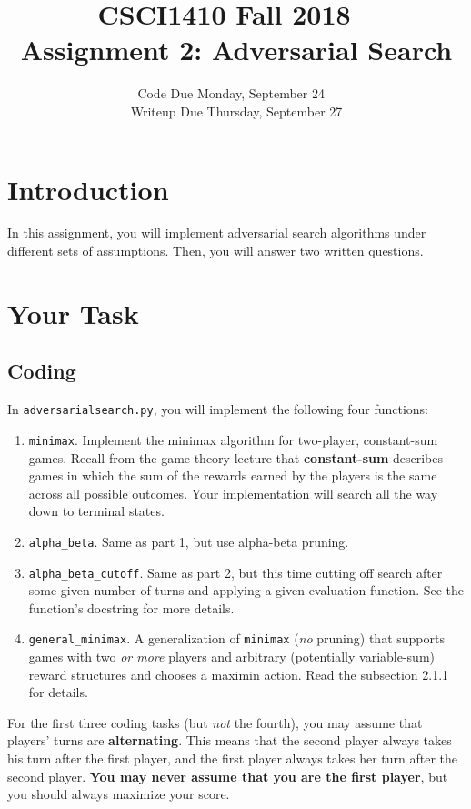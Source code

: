 \documentclass{article}
\title{CSCI1410 Fall 2018 ~\\
Assignment 2: Adversarial Search}
\date{Code Due Monday, September 24 ~\\
Writeup Due Thursday, September 27}
\begin{document}
\maketitle

\section{Introduction}
In this assignment, you will implement adversarial search algorithms under different sets of assumptions.
Then, you will answer two written questions.

\section{Your Task}
\subsection{Coding}
In \verb|adversarialsearch.py|, you will implement the following four functions:
\begin{enumerate}
\item \verb|minimax|. Implement the minimax algorithm for two-player, constant-sum games.
Recall from the game theory lecture that \textbf{constant-sum} describes games in which the sum of the rewards earned by the players is the same across all possible outcomes. Your implementation will search all the way down to terminal states. 
\item \verb|alpha_beta|. Same as part 1, but use alpha-beta pruning.
\item \verb|alpha_beta_cutoff|. Same as part 2, but this time cutting off search after some given number of turns and applying a given evaluation function. See the function's docstring for more details.
\item \verb|general_minimax|.
A generalization of \verb|minimax| (\textit{no} pruning) that supports games with two \textit{or more} players and arbitrary (potentially variable-sum) reward structures and chooses a maximin action.
Read the subsection 2.1.1 for details.
\end{enumerate}
For the first three coding tasks (but \textit{not} the fourth), you may assume that players' turns are \textbf{alternating}.
This means that the second player always takes his turn after the first player, and the first player always takes her turn after the second player.
\textbf{You may never assume that you are the first player}, but you should always maximize your score. ~\\
\end{document}
